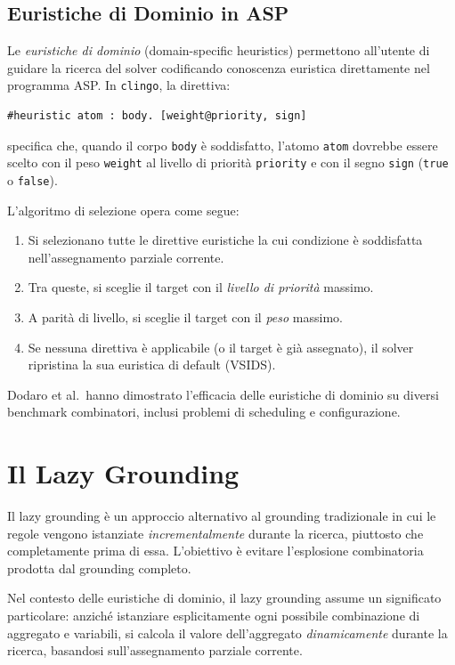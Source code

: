 \documentclass[a4paper,12pt,twoside,openright]{report}
\newcommand{\clingo}{\texttt{clingo}}
\newcommand{\vsids}{\textsc{VSIDS}}
\begin{document}
\subsection{Euristiche di Dominio in ASP}

Le \emph{euristiche di dominio} (domain-specific heuristics) permettono all'utente di guidare la ricerca del solver codificando conoscenza euristica direttamente nel programma ASP. In \clingo{}, la direttiva:
\begin{lstlisting}[caption={Sintassi della direttiva euristica in Clingo}]
#heuristic atom : body. [weight@priority, sign]
\end{lstlisting}
specifica che, quando il corpo \texttt{body} \`{e} soddisfatto, l'atomo \texttt{atom} dovrebbe essere scelto con il peso \texttt{weight} al livello di priorit\`{a} \texttt{priority} e con il segno \texttt{sign} (\texttt{true} o \texttt{false}).

L'algoritmo di selezione opera come segue:
\begin{enumerate}
    \item Si selezionano tutte le direttive euristiche la cui condizione \`{e} soddisfatta nell'assegnamento parziale corrente.
    \item Tra queste, si sceglie il target con il \emph{livello di priorit\`{a}} massimo.
    \item A parit\`{a} di livello, si sceglie il target con il \emph{peso} massimo.
    \item Se nessuna direttiva \`{e} applicabile (o il target \`{e} gi\`{a} assegnato), il solver ripristina la sua euristica di default (\vsids{}).
\end{enumerate}

Dodaro et al.\ hanno dimostrato l'efficacia delle euristiche di dominio su diversi benchmark combinatori, inclusi problemi di scheduling e configurazione.

\section{Il Lazy Grounding}
\label{sec:lazy_grounding}

Il lazy grounding \`{e} un approccio alternativo al grounding tradizionale in cui le regole vengono istanziate \emph{incrementalmente} durante la ricerca, piuttosto che completamente prima di essa. L'obiettivo \`{e} evitare l'esplosione combinatoria prodotta dal grounding completo.

Nel contesto delle euristiche di dominio, il lazy grounding assume un significato particolare: anzich\'{e} istanziare esplicitamente ogni possibile combinazione di aggregato e variabili, si calcola il valore dell'aggregato \emph{dinamicamente} durante la ricerca, basandosi sull'assegnamento parziale corrente.
\end{document}
